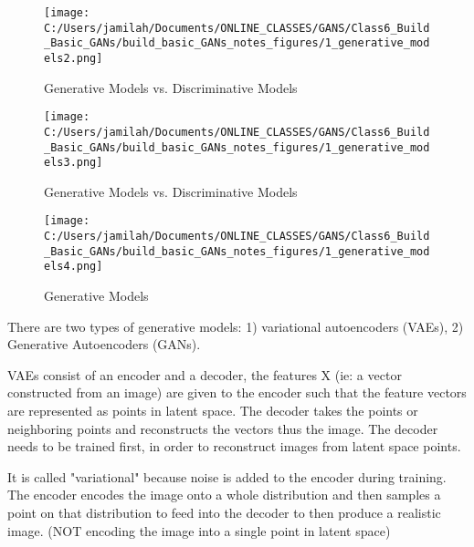 \documentclass[11pt, onecolumn]{article}
\begin{document}
\begin{figure}[htp]
\begin{center}
\texttt{[image: C:/Users/jamilah/Documents/ONLINE\_CLASSES/GANS/Class6\_Build\_Basic\_GANs/build\_basic\_GANs\_notes\_figures/1\_generative\_models2.png]}
\end{center}
\caption{Generative Models vs. Discriminative Models}
\label{1_generative_models2}
\end{figure}

\begin{figure}[htp]
\begin{center}
\texttt{[image: C:/Users/jamilah/Documents/ONLINE\_CLASSES/GANS/Class6\_Build\_Basic\_GANs/build\_basic\_GANs\_notes\_figures/1\_generative\_models3.png]}
\end{center}
\caption{Generative Models vs. Discriminative Models}
\label{1_generative_models3}
\end{figure}

\begin{figure}[htp]
\begin{center}
\texttt{[image: C:/Users/jamilah/Documents/ONLINE\_CLASSES/GANS/Class6\_Build\_Basic\_GANs/build\_basic\_GANs\_notes\_figures/1\_generative\_models4.png]}
\end{center}
\caption{Generative Models}
\label{1_generative_models4}
\end{figure}

There are two types of generative models: 1) variational autoencoders (VAEs), 2) Generative Autoencoders (GANs).

VAEs consist of an encoder and a decoder, the features X (ie: a vector constructed from an image) are given to the encoder such that the feature vectors are represented as points in latent space.  The decoder takes the points or neighboring points and reconstructs the vectors thus the image.  The decoder needs to be trained first, in order to reconstruct images from latent space points.  

It is called "variational" because noise is added to the encoder during training.  The encoder encodes the image onto a whole distribution and then samples a point on that distribution to feed into the decoder to then produce a realistic image. (NOT encoding the image into a single point in latent space)
\end{document}
